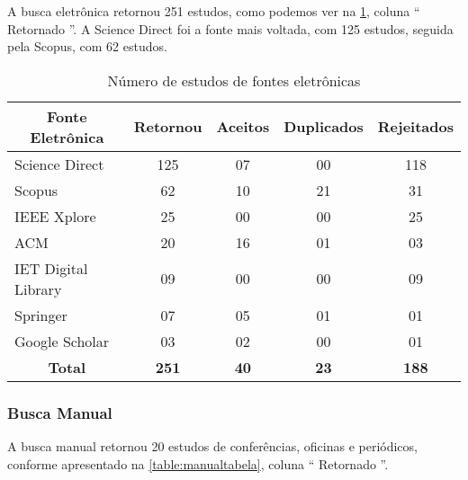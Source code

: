 A busca eletrônica retornou 251 estudos, como podemos ver na \ref{table:buscaauto}, coluna `` Retornado ''. A Science Direct foi a fonte mais voltada, com 125 estudos, seguida pela Scopus, com 62 estudos.

\begin{table}[!h]
	\centering
	\scriptsize
	\caption{Número de estudos de fontes eletrônicas}
	\label{table:buscaauto}	
	\begin{tabular}{l|c|c|c|c}
		\hline \hline
		\multicolumn{1}{c|}{\textbf{Fonte Eletrônica}} & \textbf{Retornou} & \textbf{Aceitos} & \textbf{Duplicados} & \textbf{Rejeitados} \\\hline \hline
		Science Direct 																	& 125 							& 07 								& 00 									& 118 \\\hline
		Scopus 																					& 62 								& 10 								& 21 									& 31 \\\hline
		IEEE Xplore 																		& 25 								& 00 								& 00 									& 25 \\\hline
		ACM 																						& 20 								& 16 								& 01 									& 03 \\\hline
		IET Digital Library 														& 09 								& 00 								& 00 									& 09 \\\hline
		Springer 																				& 07 								& 05 								& 01 									& 01 \\\hline			
		Google Scholar 																	& 03 								& 02 								& 00 									& 01 \\\hline
		\multicolumn{1}{c|}{\textbf{Total}} 						& \textbf{251} 			& \textbf{40} 			& \textbf{23} 				& \textbf{188} \\\hline 
		\hline
	\end{tabular}	
\end{table}

\subsubsection{Busca Manual}

A busca manual retornou 20 estudos de conferências, oficinas e periódicos, conforme apresentado na \ref{table:manualtabela}, coluna `` Retornado ''.

